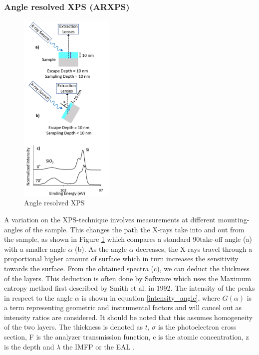 \subsubsection{Angle resolved XPS (ARXPS)}
\begin{figure}
    \centering
    \includegraphics[width=0.4\textwidth]{Figures/ARXPS.png}
    \caption{Angle resolved XPS \cite{stevie_introduction_2020}}
    \label{fig:arxps}
\end{figure}
A variation on the XPS-technique involves measurements at different mounting-angles of the sample.
This changes the path the X-rays take into and out from the sample, as shown in Figure \ref{fig:arxps} which compares a standard 90\textdegree take-off angle (a) with a smaller angle $\alpha$ (b). As the angle $\alpha$ decreases, the X-rays travel through a proportional higher amount of surface which in turn increases the sensitivity towards the surface. From the obtained spectra (c), we can deduct the thickness of the layers. This deduction is often done by Software which uses the Maximum entropy method first described by Smith et al. \cite{smith_maximum_1992} in 1992.
The intensity of the peaks in respect to the angle $\alpha$ is shown in equation \ref{intensity_angle}, where $G(\alpha)$ is a term representing geometric and instrumental factors and will cancel out as intensity ratios are considered. It should be noted that this assumes homogeneity of the two layers.
The thickness is denoted as $t$,
$\sigma$ is the photoelectron cross section,
F is the analyzer transmission function,
c is the atomic concentration,
z is the depth and $\lambda$ the IMFP or the EAL
\cite{paynter_arxps_2009}.

